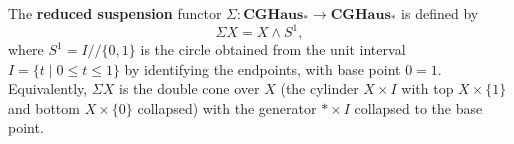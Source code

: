 The \textbf{reduced suspension} functor $\Sigma: \mathbf{CGHaus}_* \to \mathbf{CGHaus}_*$ is defined by
$$\Sigma X = X \wedge S^1,$$
where $S^1 = I /\!/ \{0, 1\}$ is the circle obtained from the unit interval $I = \{t \mid 0 \leq t \leq 1\}$ by identifying the endpoints, with base point $0 = 1$. Equivalently, $\Sigma X$ is the double cone over $X$ (the cylinder $X \times I$ with top $X \times \{1\}$ and bottom $X \times \{0\}$ collapsed) with the generator $* \times I$ collapsed to the base point.

